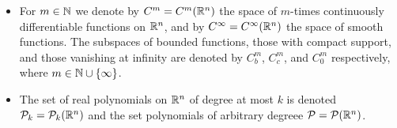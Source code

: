\begin{notationpage}
\begin{itemize}
  \item For $m \in \mathbb{N}$ we denote by $C^m = C^m(\mathbb{R}^n)$ the space of $m$-times continuously differentiable functions on $\mathbb{R}^n$, and by $C^\infty = C^\infty(\mathbb{R}^n)$ the space of smooth functions. The subspaces of bounded functions, those with compact support, and those vanishing at infinity are denoted by $C_b^m$, $C_c^m$, and $C_0^m$ respectively, where $m \in \mathbb{N} \cup \{\infty\}$.
  
  \item The set of real polynomials on $\mathbb{R}^n$ of degree at most $k$ is denoted $\mathcal{P}_k = \mathcal{P}_k(\mathbb{R}^n)$ and the set polynomials of arbitrary degreee $\mathcal{P} = \mathcal{P}(\mathbb{R}^n)$.
\end{itemize}


\end{notationpage}
